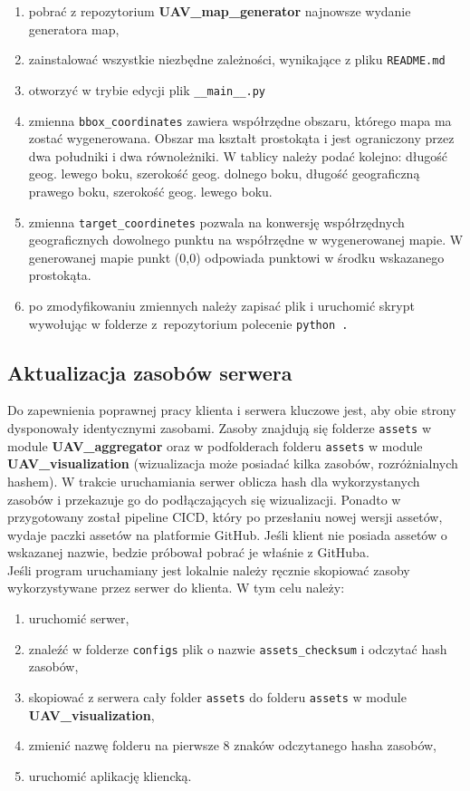  \begin{enumerate}
 	\item pobrać z repozytorium \textbf{UAV\_map\_generator} najnowsze wydanie generatora map,
 	\item zainstalować wszystkie niezbędne zależności, wynikające z pliku \texttt{README.md}
 	\item otworzyć w trybie edycji plik \texttt{\_\_main\_\_.py}
 	\item zmienna \texttt{bbox\_coordinates} zawiera współrzędne obszaru, którego mapa ma zostać wygenerowana. Obszar ma kształt prostokąta i jest ograniczony przez dwa południki i dwa równoleżniki. W tablicy należy podać kolejno: długość geog. lewego boku, szerokość geog. dolnego boku, długość geograficzną prawego boku, szerokość geog. lewego boku.
 	\item zmienna \texttt{target\_coordinetes} pozwala na konwersję współrzędnych geograficznych dowolnego punktu na współrzędne w wygenerowanej mapie. W generowanej mapie punkt (0,0) odpowiada punktowi w środku wskazanego prostokąta.
 	\item po zmodyfikowaniu zmiennych należy zapisać plik i uruchomić skrypt wywołując w folderze z~repozytorium polecenie \texttt{python .}
 \end{enumerate}

\subsection{Aktualizacja zasobów serwera}

Do zapewnienia poprawnej pracy klienta i serwera kluczowe jest, aby obie strony dysponowały identycznymi zasobami. Zasoby znajdują się folderze \texttt{assets} w module \textbf{UAV\_aggregator} oraz w podfolderach folderu \texttt{assets} w module \textbf{UAV\_visualization} (wizualizacja może posiadać kilka zasobów, rozróżnialnych hashem). W trakcie uruchamiania serwer oblicza hash dla wykorzystanych zasobów i przekazuje go do podłączających się wizualizacji. Ponadto w przygotowany został pipeline CICD, który po przesłaniu nowej wersji assetów, wydaje paczki assetów na platformie GitHub. Jeśli klient nie posiada assetów o wskazanej nazwie, bedzie próbował pobrać je właśnie z GitHuba.\\

Jeśli program uruchamiany jest lokalnie należy ręcznie skopiować zasoby wykorzystywane przez serwer do klienta. W tym celu należy:
\begin{enumerate}
\item uruchomić serwer,
\item znaleźć w folderze \texttt{configs} plik o nazwie \texttt{assets\_checksum} i odczytać hash zasobów,
\item skopiować z serwera cały folder \texttt{assets} do folderu \texttt{assets} w module\\ \textbf{UAV\_visualization},
\item zmienić nazwę folderu na pierwsze 8 znaków odczytanego hasha zasobów,
\item uruchomić aplikację kliencką.
\end{enumerate}